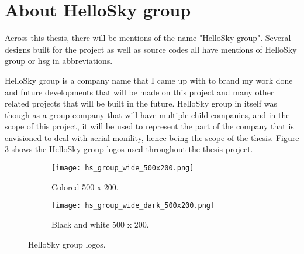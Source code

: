 \section{About HelloSky group}
\label{sec:about-hellosky-group}

Across this thesis, there will be mentions of the name "HelloSky group". Several designs built for the project as well as source codes all have mentions of HelloSky group or hsg in abbreviations.

HelloSky group is a company name that I came up with to brand my work done and future developments that will be made on this project and many other related projects that will be built in the future. HelloSky group in itself was though as a group company that will have multiple child companies, and in the scope of this project, it will be used to represent the part of the company that is envisioned to deal with aerial monility, hence being the scope of the thesis. Figure \ref{fig:hs-group-logos} shows the HelloSky group logos used throughout the thesis project.

\begin{figure}[!h]
    \centering
    \begin{subfigure}{0.4\textwidth}
        \texttt{[image: hs\_group\_wide\_500x200.png]}
        \caption{Colored 500 x 200.}
        \label{fig:hs-group-wide-500x200}
    \end{subfigure}
    \hspace*{\fill}
    \begin{subfigure}{0.4\textwidth}
        \texttt{[image: hs\_group\_wide\_dark\_500x200.png]}
        \caption{Black and white 500 x 200.}
        \label{fig:hs-group-wide-dark-500x200}
    \end{subfigure}
    \caption{HelloSky group logos.}
    \label{fig:hs-group-logos}
\end{figure}


